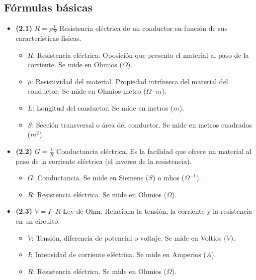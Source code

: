 \documentclass{article}
\begin{document}
		\subsection*{Fórmulas básicas}
			\begin{itemize}
				\item \textbf{(2.1)} $\boxed{R=\rho\frac{L}{S}}$ Resistencia eléctrica de un conductor en función de sus características físicas.
					\begin{itemize}
						\item $R$: Resistencia eléctrica. Oposición que presenta el material al paso de la corriente. Se mide en Ohmios ($\Omega$).
						\item $\rho$: Resistividad del material. Propiedad intrínseca del material del conductor. Se mide en Ohmios-metro ($\Omega\cdot m$).
						\item $L$: Longitud del conductor. Se mide en metros ($m$).
						\item $S$: Sección transversal o área del conductor. Se mide en metros cuadrados ($m^2$).
					\end{itemize}    

				\item \textbf{(2.2)} $\boxed{G=\frac{1}{R}}$ Conductancia eléctrica. Es la facilidad que ofrece un material al paso de la corriente eléctrica (el inverso de la resistencia).
					\begin{itemize}
						\item $G$: Conductancia. Se mide en Siemens ($S$) o mhos ($\Omega^{-1}$).
						\item $R$: Resistencia eléctrica. Se mide en Ohmios ($\Omega$).
					\end{itemize}

				\item \textbf{(2.3)} $\boxed{V=I\cdot R}$ Ley de Ohm. Relaciona la tensión, la corriente y la resistencia en un circuito.
					\begin{itemize}
						\item $V$: Tensión, diferencia de potencial o voltaje. Se mide en Voltios ($V$).
						\item $I$: Intensidad de corriente eléctrica. Se mide en Amperios ($A$).
						\item $R$: Resistencia eléctrica. Se mide en Ohmios ($\Omega$).
					\end{itemize}
			\end{itemize}
\end{document}
